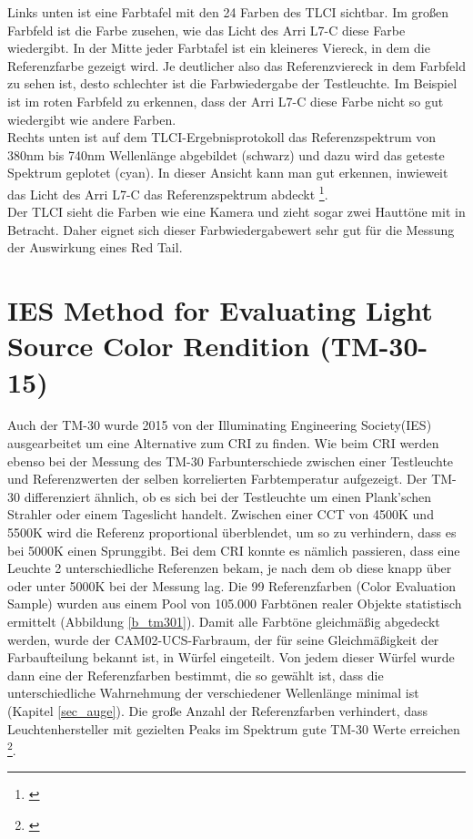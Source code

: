 Links unten ist eine Farbtafel mit den 24 Farben des TLCI sichtbar. Im großen Farbfeld ist die Farbe zusehen, wie das Licht des Arri L7-C diese Farbe wiedergibt. In der Mitte jeder Farbtafel ist ein kleineres Viereck, in dem die Referenzfarbe gezeigt wird. Je deutlicher also das Referenzviereck in dem Farbfeld zu sehen ist, desto schlechter ist die Farbwiedergabe der Testleuchte. Im Beispiel  ist im roten Farbfeld zu erkennen, dass der Arri L7-C diese Farbe nicht so gut wiedergibt wie andere Farben.\\ 
Rechts unten ist auf dem TLCI-Ergebnisprotokoll das Referenzspektrum von 380nm bis 740nm Wellenlänge abgebildet (schwarz) und dazu wird das geteste Spektrum geplotet (cyan). In dieser Ansicht kann man gut erkennen, inwieweit das Licht des Arri L7-C das Referenzspektrum abdeckt \footnote{\cite[15]{roberts}}.\\

Der TLCI sieht die Farben wie eine Kamera und zieht sogar zwei Hauttöne mit in Betracht. Daher eignet sich dieser Farbwiedergabewert sehr gut für die Messung der Auswirkung eines Red Tail.  



\section{IES Method for Evaluating Light Source Color Rendition (TM-30-15)} \label{sec_tm30}

Auch der TM-30 wurde 2015 von der \glqq Illuminating Engineering Society\grqq (IES) ausgearbeitet um eine Alternative zum CRI zu finden. Wie beim CRI werden ebenso bei der Messung des TM-30 Farbunterschiede zwischen einer Testleuchte und Referenzwerten der selben korrelierten Farbtemperatur aufgezeigt. Der TM-30 differenziert ähnlich, ob es sich bei der Testleuchte um einen Plank'schen Strahler  oder einem Tageslicht handelt. Zwischen einer CCT von 4500K und 5500K wird die Referenz proportional überblendet, um so zu verhindern, dass es bei 5000K einen \glqq Sprung\grqq gibt. Bei dem CRI konnte es nämlich passieren, dass eine Leuchte 2 unterschiedliche Referenzen bekam, je nach dem ob diese knapp über oder unter 5000K bei der Messung lag. 
Die 99 Referenzfarben (Color Evaluation Sample) wurden aus einem Pool von 105.000 Farbtönen realer Objekte statistisch ermittelt (Abbildung \ref{b_tm301}). Damit alle Farbtöne gleichmäßig abgedeckt werden, wurde der CAM02-UCS-Farbraum, der für seine Gleichmäßigkeit der Farbaufteilung bekannt ist, in Würfel eingeteilt. Von jedem dieser Würfel wurde dann eine der Referenzfarben bestimmt, die so gewählt ist, dass die unterschiedliche Wahrnehmung der verschiedener Wellenlänge minimal ist (Kapitel \ref{sec_auge}). Die große Anzahl der Referenzfarben verhindert, dass Leuchtenhersteller mit gezielten Peaks im Spektrum gute TM-30 Werte erreichen \footnote{\cite{usdep}}.
\newpage

